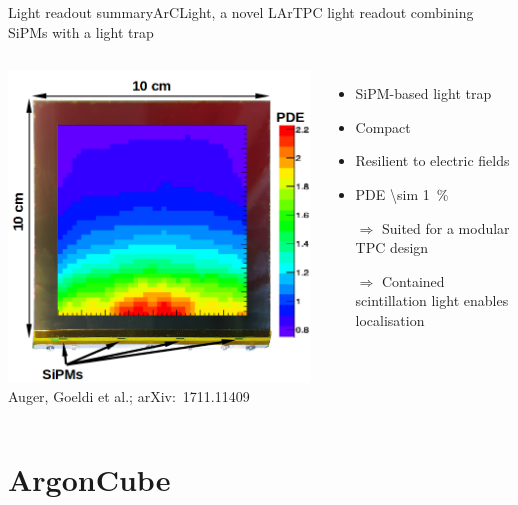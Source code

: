 \documentclass[]{beamer}
\newcommand*{\emphcol}{blue}
\newcommand*{\AC}{{ArgonCube}}
\newcommand*{\AL}{{ArCLight}}
\newcommand*{\lartpc}{{LArTPC}}
\begin{document}
\begin{frame}{Light readout summary}{\AL{}, a novel \lartpc{} light readout combining SiPMs with a light trap}
	\begin{columns}[c]
		\centering
		\includegraphics[width=\textwidth]{arclight/PDE}\\
		{\tiny Auger, Goeldi et al.; arXiv:~1711.11409~\cite{arclight}}
		\begin{itemize}
			\item SiPM-based light trap
			\item Compact
			\item Resilient to electric fields
			\item PDE \SI{\sim 1}{\percent}
			\item[$\Rightarrow$] Suited for a modular TPC design
			\item[$\Rightarrow$] {\color{\emphcol} Contained scintillation light enables localisation}
		\end{itemize}
	\end{columns}
\end{frame}

\section{\AC{}}
\end{document}
